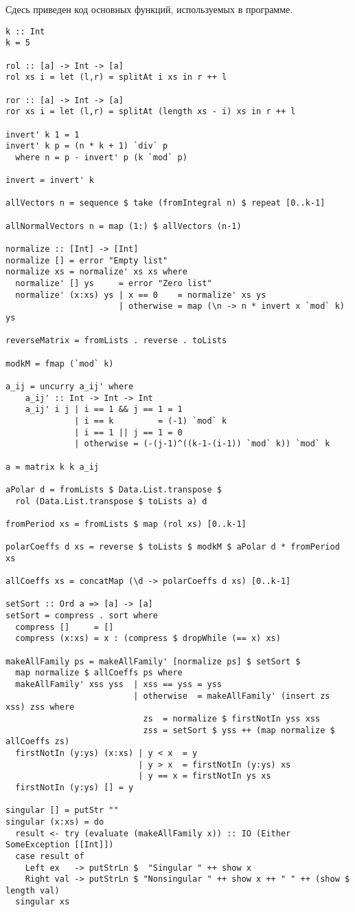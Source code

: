 \documentclass[bibliography=totoc, a4paper, 14pt]{extarticle}
\begin{document}
Сдесь приведен код основных функций, используемых в программе.
\begin{footnotesize}
\begin{verbatim}
k :: Int
k = 5

rol :: [a] -> Int -> [a]
rol xs i = let (l,r) = splitAt i xs in r ++ l

ror :: [a] -> Int -> [a]
ror xs i = let (l,r) = splitAt (length xs - i) xs in r ++ l

invert' k 1 = 1
invert' k p = (n * k + 1) `div` p
  where n = p - invert' p (k `mod` p)

invert = invert' k

allVectors n = sequence $ take (fromIntegral n) $ repeat [0..k-1]

allNormalVectors n = map (1:) $ allVectors (n-1)

normalize :: [Int] -> [Int]
normalize [] = error "Empty list"
normalize xs = normalize' xs xs where
  normalize' [] ys     = error "Zero list"
  normalize' (x:xs) ys | x == 0    = normalize' xs ys
                       | otherwise = map (\n -> n * invert x `mod` k) ys

reverseMatrix = fromLists . reverse . toLists

modkM = fmap (`mod` k)

a_ij = uncurry a_ij' where
    a_ij' :: Int -> Int -> Int
    a_ij' i j | i == 1 && j == 1 = 1
              | i == k         = (-1) `mod` k
              | i == 1 || j == 1 = 0
              | otherwise = (-(j-1)^((k-1-(i-1)) `mod` k)) `mod` k

a = matrix k k a_ij

aPolar d = fromLists $ Data.List.transpose $
  rol (Data.List.transpose $ toLists a) d

fromPeriod xs = fromLists $ map (rol xs) [0..k-1]

polarCoeffs d xs = reverse $ toLists $ modkM $ aPolar d * fromPeriod xs

allCoeffs xs = concatMap (\d -> polarCoeffs d xs) [0..k-1]

setSort :: Ord a => [a] -> [a]
setSort = compress . sort where
  compress []     = []
  compress (x:xs) = x : (compress $ dropWhile (== x) xs)

makeAllFamily ps = makeAllFamily' [normalize ps] $ setSort $
  map normalize $ allCoeffs ps where
  makeAllFamily' xss yss  | xss == yss = yss    
                          | otherwise  = makeAllFamily' (insert zs xss) zss where
                            zs  = normalize $ firstNotIn yss xss
                            zss = setSort $ yss ++ (map normalize $ allCoeffs zs)
  firstNotIn (y:ys) (x:xs) | y < x  = y
                           | y > x  = firstNotIn (y:ys) xs
                           | y == x = firstNotIn ys xs
  firstNotIn (y:ys) [] = y

singular [] = putStr ""
singular (x:xs) = do
  result <- try (evaluate (makeAllFamily x)) :: IO (Either SomeException [[Int]])
  case result of
    Left ex   -> putStrLn $  "Singular " ++ show x
    Right val -> putStrLn $ "Nonsingular " ++ show x ++ " " ++ (show $ length val)
  singular xs

\end{verbatim}
\end{footnotesize}
\end{document}
